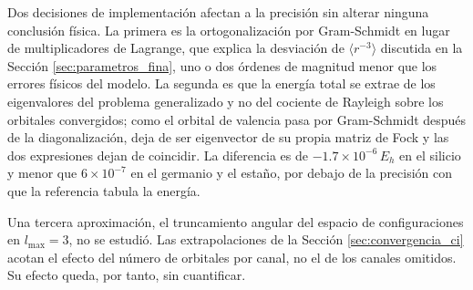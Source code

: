 Dos decisiones de implementación afectan a la precisión sin alterar ninguna conclusión física. La primera es la ortogonalización por Gram-Schmidt en lugar de multiplicadores de Lagrange, que explica la desviación de $\langle r^{-3}\rangle$ discutida en la Sección \ref{sec:parametros_fina}, uno o dos órdenes de magnitud menor que los errores físicos del modelo. La segunda es que la energía total se extrae de los eigenvalores del problema generalizado y no del cociente de Rayleigh sobre los orbitales convergidos; como el orbital de valencia pasa por Gram-Schmidt después de la diagonalización, deja de ser eigenvector de su propia matriz de Fock y las dos expresiones dejan de coincidir. La diferencia es de $-1.7\times10^{-6}\,E_h$ en el silicio y menor que $6\times10^{-7}$ en el germanio y el estaño, por debajo de la precisión con que la referencia tabula la energía.

Una tercera aproximación, el truncamiento angular del espacio de configuraciones en $l_{\max}=3$, no se estudió. Las extrapolaciones de la Sección \ref{sec:convergencia_ci} acotan el efecto del número de orbitales por canal, no el de los canales omitidos. Su efecto queda, por tanto, sin cuantificar.

